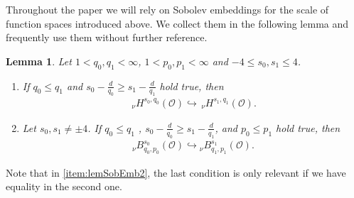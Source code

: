 \documentclass[reqno]{amsart}
\newtheorem{lemma}[Satz]{Lemma}
\newcommand{\sO}{\mathscr{O}}
\newcommand{\1}{\mathbf{1}}
\newcommand{\nH}{\ensuremath{\,_\nu H}}
\newcommand{\bpsn}[1]{\ensuremath{\nH^{#1}(\sO)}}
\begin{document}
Throughout the paper we will rely on Sobolev embeddings for the scale of function spaces introduced above. We collect them in the following lemma and frequently use them without further reference.

\begin{lemma}
Let $1<q_0,q_1<\infty$, $1< p_0,p_1< \infty$ and $-4\leq s_0,s_1 \leq 4$.
\begin{enumerate}[label=(\roman*)]
    \item \label{item:lemSobEmb1} If $q_0\leq q_1$ and $s_0-\frac{d}{q_0}\geq s_1-\frac{d}{q_1}$ hold true, then 
\begin{align*}
    \bpsn{s_0,q_0} \hookrightarrow \bpsn{s_1,q_1}.
\end{align*}
\item \label{item:lemSobEmb2} Let $s_0,s_1 \neq \pm 4$. If $q_0\leq q_1$ , $s_0-\frac{d}{q_0}\geq s_1-\frac{d}{q_1}$, and $p_0\leq p_1$ hold true, then 
\begin{align*}
    {_\nu B^{ s_0 }_{q_0,p_0}(\sO)}\hookrightarrow {_\nu B^{ s_1 }_{q_1,p_1}(\sO)}.
\end{align*}
\end{enumerate}
\end{lemma}
Note that in \ref{item:lemSobEmb2}, the last condition is only relevant if we have equality in the second one.
\end{document}
